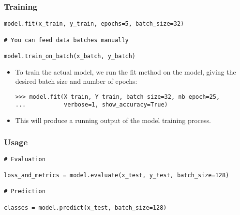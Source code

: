 \begin{frame}[fragile] \frametitle{Training}
\begin{lstlisting}
model.fit(x_train, y_train, epochs=5, batch_size=32)

# You can feed data batches manually

model.train_on_batch(x_batch, y_batch)
\end{lstlisting}

\begin{itemize}
\item To train the actual model, we run the fit method on
the model, giving the desired batch size and number
of epochs:
\begin{lstlisting}
>>> model.fit(X_train, Y_train, batch_size=32, nb_epoch=25,
...           verbose=1, show_accuracy=True)
\end{lstlisting}
\item This will produce a running output of the model training
process.

\end{itemize}
\end{frame}


\begin{frame}[fragile] \frametitle{Usage}
\begin{lstlisting}
# Evaluation

loss_and_metrics = model.evaluate(x_test, y_test, batch_size=128)

# Prediction

classes = model.predict(x_test, batch_size=128)
\end{lstlisting}

\end{frame}





